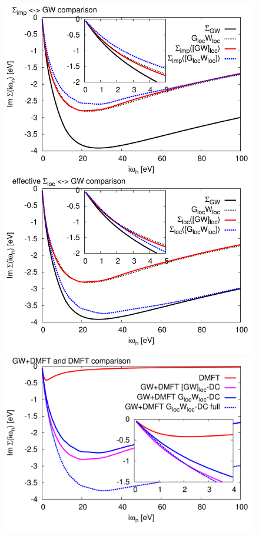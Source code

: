 \documentclass[12pt,a4paper]{scrartcl}
\numberwithin{equation}{section}
\begin{document}
\begin{figure}[H]
\begin{minipage}{0.5\textwidth}
\includegraphics[width=1\textwidth]{figs/results/SrVO3_DC_comparison.pdf} 
\includegraphics[width=1\textwidth]{figs/results/SrVO3_DC_comparison2.pdf} 

\end{minipage}
\end{figure}
\end{document}
